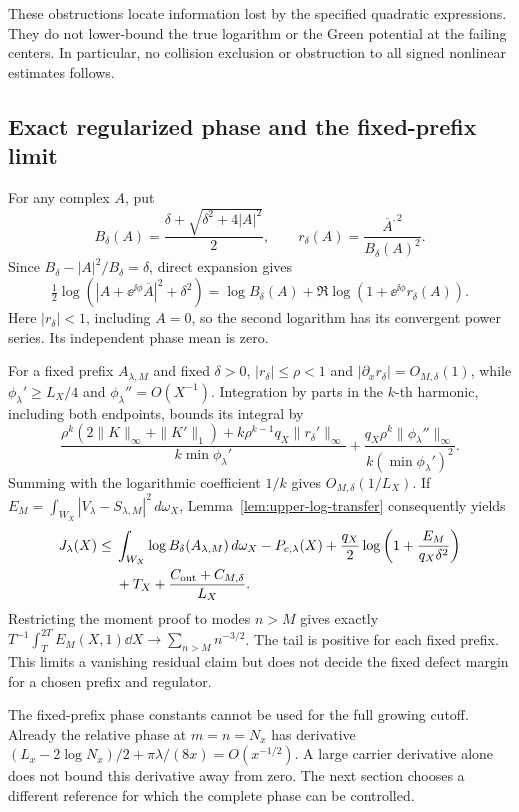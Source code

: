 These obstructions locate information lost by the specified quadratic
expressions. They do not lower-bound the true logarithm or the Green
potential at the failing centers. In particular, no collision exclusion
or obstruction to all signed nonlinear estimates follows.

\subsection{Exact regularized phase and the fixed-prefix limit}
For any complex \(A\), put
\[
 B_\delta(A)=\frac{\delta+\sqrt{\delta^2+4|A|^2}}2,
 \qquad r_\delta(A)=\frac{\overline A^{,2}}{B_\delta(A)^2}.
\]
Since \(B_\delta-|A|^2/B_\delta=\delta\), direct expansion gives
\begin{equation}\label{eq:regularized-phase-factor}
 \tfrac12\log(|A+\ee^{\ii\phi}\overline A|^2+\delta^2)
 =\log B_\delta(A)+\Re\log(1+\ee^{\ii\phi}r_\delta(A)).
\end{equation}
Here \(|r_\delta|<1\), including \(A=0\), so the second logarithm
has its convergent power series. Its independent phase mean is zero.

For a fixed prefix \(A_{\lambda,M}\) and fixed \(\delta>0\),
\(|r_\delta|\le\rho<1\) and \(|\partial_x r_\delta|=O_{M,\delta}(1)\),
while \(\phi_\lambda'\ge L_X/4\) and
\(\phi_\lambda''=O(X^{-1})\). Integration by parts in the \(k\)-th
harmonic, including both endpoints, bounds its integral by
\[
 \frac{\rho^k(2\|K\|_\infty+\|K'\|_1)
       +k\rho^{k-1}q_X\|r_\delta'\|_\infty}{k\min\phi_\lambda'}
 +\frac{q_X\rho^k\|\phi_\lambda''\|_\infty}
       {k(\min\phi_\lambda')^2}.
\]
Summing with the logarithmic coefficient \(1/k\) gives
\(O_{M,\delta}(1/L_X)\). If
\(E_M=\int_{W_X}|V_\lambda-S_{\lambda,M}|^2\,d\omega_X\),
Lemma~\ref{lem:upper-log-transfer} consequently yields
\begin{align}\label{eq:prefix-transfer}
 J_\lambda(X)\le{}&\int_{W_X}\log B_\delta(A_{\lambda,M})\,d\omega_X
       -P_{c,\lambda}(X)
       +\frac{q_X}{2}\log\left(1+\frac{E_M}{q_X\delta^2}\right)
       \nonumber\\
 &+T_X+\frac{C_{\rm out}+C_{M,\delta}}{L_X}.
\end{align}
Restricting the moment proof to modes \(n>M\) gives exactly
\(T^{-1}\int_T^{2T}E_M(X,1)\dd X\to\sum_{n>M}n^{-3/2}\).
The tail is positive for each fixed prefix. This limits a vanishing
residual claim but does not decide the fixed defect margin for a
chosen prefix and regulator.

The fixed-prefix phase constants cannot be used for the full growing
cutoff. Already the relative phase at \(m=n=N_x\) has derivative
\((L_x-2\log N_x)/2+\pi\lambda/(8x)=O(x^{-1/2})\).
A large carrier derivative alone does not bound this derivative away
from zero. The next section chooses a different reference for which
the complete phase can be controlled.
